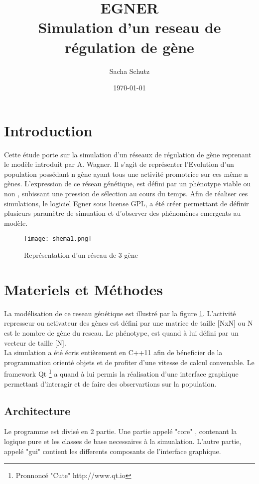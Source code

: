 \documentclass{article}
\title {EGNER\\ Simulation d'un reseau de régulation de gène}
\author {Sacha Schutz}
\date {\today}
\begin{document}
	\maketitle

	\section{Introduction} %
	Cette étude porte sur la simulation d'un réseaux de régulation de gène reprenant le modèle introduit par A. Wagner. Il s'agit de représenter l'Evolution d'un population possédant n gène ayant tous une activité promotrice sur ces même n gènes. L'expression de ce réseau génétique, est défini par un phénotype viable ou non , subissant une pression de sélection au cours du temps. Afin de réaliser ces simulations, le logiciel Egner sous license GPL, a été créer permettant de définir plusieurs paramètre de simuation et d'observer des phénomènes emergents au modèle.

	\begin{figure}[h]
	\label{figure1}
	\caption[test]{Représentation d'un réseau de 3 gène }
	\centering
	\texttt{[image: shema1.png]}
	\end{figure}

	\section{Materiels et Méthodes} 
	La modélisation de ce reseau génétique est illustré par la figure \ref{figure1}. L'activité represseur ou activateur des gènes est défini par une matrice de taille [NxN] ou N est le nombre de gène du reseau. Le phénotype, est quand à lui défini par un vecteur de taille [N]. \\
	La simulation a été écris entièrement en C++11 afin de béneficier de la programmation orienté objets et de profiter d'une vitesse de calcul convenable. Le framework Qt \footnote{Pronnoncé "Cute"  http://www.qt.io} a quand à lui permis la réalisation d'une interface graphique permettant d'interagir et de faire des observartions sur la population. 
	\subsection {Architecture}
	Le programme est divisé en 2 partie. Une partie appelé "core" , contenant la logique pure et les classes de base necessaires à la simualation. L'autre partie, appelé "gui" contient les differents composants de l'interface graphique.
\end{document}
